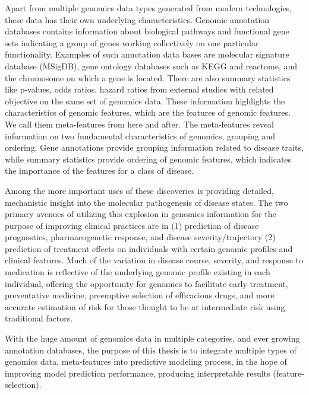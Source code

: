 Apart from multiple genomics data types generated from modern technologies, these data has their own underlying characteristics. Genomic annotation databases contains information about biological pathways and functional gene sets indicating a group of genes working collectively on one particular functionality. Examples of such annotation data bases are molecular signature database (MSigDB), gene ontology databases such as KEGG and reactome, and the chromosome on which a gene is located. There are also summary statistics like p-values, odds ratios, hazard ratios from external studies with related objective on the same set of genomics data. These information highlights the characteristics of genomic features, which are the features of genomic features. We call them meta-features from here and after. The meta-features reveal information on two fundamental characteristics of genomics, grouping and ordering. Gene annotations provide grouping information related to disease traits, while summary statistics provide ordering of genomic features, which indicates the importance of the features for a class of disease. 

Among the more important uses of these discoveries is providing detailed, mechanistic insight into the molecular pathogenesis of disease states. The two primary avenues of utilizing this explosion in genomics information for the purpose of improving clinical practices are in (1) prediction of disease prognostics, pharmacogenetic response, and disease severity/trajectory (2) prediction of treatment effects on individuals with certain genomic profiles and clinical features. Much of the variation in disease course, severity, and response to medication is reﬂective of the underlying genomic profile existing in each individual, offering the opportunity for genomics to facilitate early treatment, preventative medicine, preemptive selection of efﬁcacious drugs, and more accurate estimation of risk for those thought to be at intermediate risk using traditional factors.

With the huge amount of genomics data in multiple categories, and ever growing annotation databases, the purpose of this thesis is to integrate multiple types of genomics data, meta-features into predictive modeling process, in the hope of improving model prediction performance, producing interpretable results (feature-selection).

